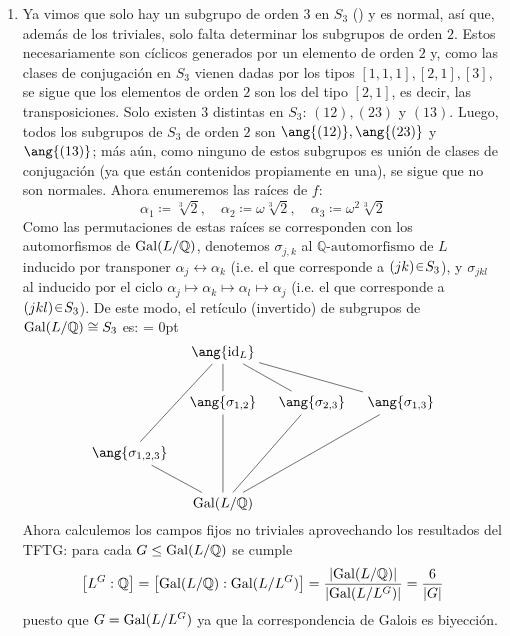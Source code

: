 \begin{sol}
\begin{enumerate}[label=\alph*)]
\item 
Ya vimos que solo hay un subgrupo de orden 3 en $S_3$ () y es normal, así que, además de los triviales, solo falta determinar los subgrupos de orden $2$. Estos necesariamente son cíclicos generados por un elemento de orden $2$ y, como las clases de conjugación en $S_3$ vienen dadas por los tipos $[1,1,1],[2,1],[3]$, se sigue que los elementos de orden $2$ son los del tipo $[2,1]$, es decir, las transposiciones. Solo existen $3$ distintas en $S_3$: $(12),(23)$ y $(13)$. Luego, todos los subgrupos de $S_3$ de orden $2$ son $\ang{(12)},\ang{(23)}$ y $\ang{(13)}$; más aún, como ninguno de estos subgrupos es unión de clases de conjugación (ya que están contenidos propiamente en una), se sigue que no son normales. Ahora enumeremos las raíces de $f$:
\[
\alpha_1 \coloneq \sqrt[3]{2},%
\quad
\alpha_2 \coloneq \omega\sqrt[3]{2},%
\quad
\alpha_3 \coloneq\omega^2\sqrt[3]{2}
\]
Como las permutaciones de estas raíces se corresponden con los automorfismos de $\gal(L/\mathbb{Q})$, denotemos $\sigma_{j,k}$ al $\mathbb{Q}\text{-automorfismo}$ de $L$ inducido por transponer $\alpha_j \leftrightarrow \alpha_k$ (i.e. el que corresponde a $(jk) \en S_3$), y $\sigma_{jkl}$ al inducido por el ciclo $\alpha_j \mapsto \alpha_k \mapsto \alpha_l \mapsto \alpha_j$ (i.e. el que corresponde a $(jkl)\en S_3$). De este modo, el retículo (invertido) de subgrupos de $\gal(L/\mathbb{Q}) \cong S_3$ es:
{\mathsurround = 0pt
\[\begin{tikzcd}[cramped, column sep = 1em,row sep = 2em]
	& {\ang{\id_{L}}} \\
	& {\ang{\sigma_{1,2}}} & {\ang{\sigma_{2,3}}} & {\ang{\sigma_{1,3}}} \\
	{\ang{\sigma_{1,2,3}}} \\
	& {\gal(L/\mathbb{Q})}
	\arrow[no head, from=2-2, to=1-2]
	\arrow[no head, from=2-3, to=1-2]
	\arrow[no head, from=2-4, to=1-2]
	\arrow[no head, from=3-1, to=1-2]
	\arrow[no head, from=4-2, to=2-2]
	\arrow[no head, from=4-2, to=2-3]
	\arrow[no head, from=4-2, to=2-4]
	\arrow[no head, from=4-2, to=3-1]
\end{tikzcd}\]
}
Ahora calculemos los campos fijos no triviales aprovechando los resultados del TFTG: para cada $G \leq\gal(L/\mathbb{Q})$ se cumple
\[
    \brack[\big]{L^G : \mathbb{Q}} = \brack[\big]{\gal(L/\mathbb{Q}) : \gal(L/L^G)} = \frac{ \abs{\gal(L/\mathbb{Q})} }{ \abs{\gal(L/L^G)} } = \frac{6}{\abs{G}}
\]
puesto que $G = \gal(L/L^G)$ ya que la correspondencia de Galois es biyección.
\begin{itemize}

\end{itemize}
\end{enumerate}
\end{sol}
